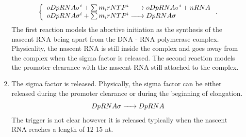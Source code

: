 \begin{enumerate}
      $$
        \left\{
          \begin{array}{l}
            \reactionIrr{oDpRNA\sigma^i + \sum m_irNTP^i}{oDpRNA\sigma^i + nRNA}{}{} \\
            \reactionIrr{oDpRNA\sigma^i + \sum m_irNTP^i}{DpRNA\sigma}{}{} \\
          \end{array}
        \right.
        .
      $$
      The first reaction models the abortive initiation as the synthesis of the nascent RNA being apart from the DNA - RNA polymerase complex. Physicality, the nascent RNA is still inside the complex and goes away from the complex when the sigma factor is released. The second reaction models the promoter clearance with the nascent RNA still attached to the complex.
  \item The sigma factor is released. Physically, the sigma factor can be either released during the promoter clearance or during the beginning of elongation.
      $$
        \reactionIrr{DpRNA\sigma}{DpRNA}{}{} \\
      $$
      The trigger is not clear however it is released typically when the nascent RNA reaches a length of 12-15 nt.
\end{enumerate}








